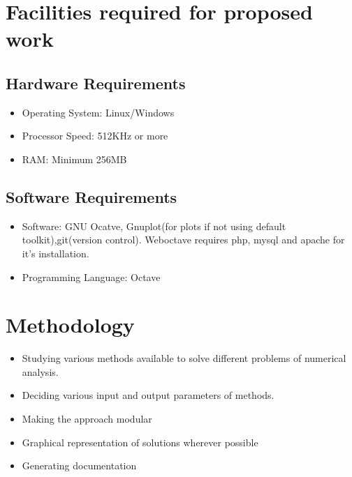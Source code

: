 
\section{Facilities required for proposed work}
\subsection{Hardware Requirements}
\begin{itemize}
\item Operating System: Linux/Windows
\item Processor Speed: 512KHz or more
\item RAM: Minimum 256MB
\end{itemize}
\subsection{Software Requirements}
\begin{itemize}
\item Software: GNU Ocatve, Gnuplot(for plots if not using default toolkit),git(version control).
Weboctave requires php, mysql and apache for it's installation.
\item Programming Language: Octave
\end{itemize}

\section{Methodology}
\begin{itemize}
\item Studying various methods available to solve different problems of numerical analysis.
\item Deciding various input and output parameters of methods.
\item Making the approach modular 
\item Graphical representation of solutions wherever possible
\item Generating documentation
\end{itemize}
